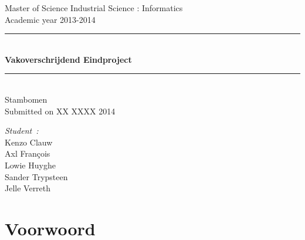\documentclass[pdftex,a4paper,12pt,twoside]{report}
\newcommand{\HRule}{\rule{\linewidth}{0.5mm}}
\newcommand{\emptypage}
{
	\newpage
	\thispagestyle{empty}
	\mbox{}
	\newpage
}
\newcommand{\studenta}{Kenzo Clauw}
\newcommand{\studentb}{Axl Fran\c{c}ois}
\newcommand{\studentc}{Lowie Huyghe}
\newcommand{\studentd}{Sander Trypsteen}
\newcommand{\studente}{Jelle Verreth}
\newcommand{\titel}{Vakoverschrijdend Eindproject}
\newcommand{\ondertitel}{ Stambomen}
\newcommand{\datum}{XX XXXX 2014}
\newcommand{\academiejaar}{2013-2014}
\begin{document}

\emptypage


\begin{titlepage}
\begin{center}
Master of Science Industrial Science : Informatics\\
Academic year \academiejaar

\vfill

\HRule \\[0.4cm]
{ \huge \bfseries \titel}\\[0.4cm]
\HRule \\[0.4cm]

{\Large \ondertitel}\\[0.4cm]

Submitted on \datum

\vfill

\begin{minipage}{0.49\textwidth}
\begin{flushleft}
\emph{Student\ifdefined\ \fi :}\\
\studenta \\
\studentb \\
\studentc \\
\studentd \\
\studente
\end{flushleft}
\end{minipage}
\begin{minipage}{0.49\textwidth}
\begin{flushright}
\end{flushright}
\end{minipage}

\end{center}

\end{titlepage}

\abstract


\tableofcontents

\chapter{Voorwoord}\label{ch:preface}
\end{document}
